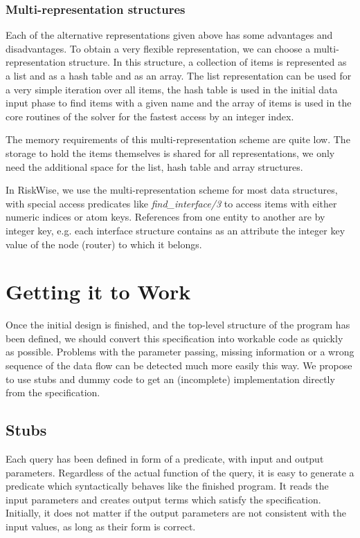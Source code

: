 \documentclass[a4paper,12pt]{report}
\begin{document}
\subsection{Multi-representation structures}
Each of the alternative representations given above has some advantages and disadvantages. To obtain a very flexible representation, we can choose a multi-representation structure. In this structure, a collection of items is represented as a list and as a hash table and as an array. The list representation can be used for a very simple iteration over all items, the hash table is used in the initial data input phase to find items with a given name and the array of items is used in the core routines of the solver for the fastest access by an integer index. 

The memory requirements of this multi-representation scheme are quite low. The storage to hold the items themselves is shared for all representations, we only need the additional space for the list, hash table and array structures.

In RiskWise, we use the multi-representation scheme for most data structures, with special access predicates like {\it find\_interface/3} to access items with either numeric indices or atom keys. References from one entity to another are by integer key, e.g. each interface structure contains as an attribute the integer key value of the node (router) to which it belongs.

\chapter{Getting it to Work}
\label{gettingittowork}

Once the initial design is finished, and the top-level structure of the program has been defined, we should convert this specification into workable code as quickly as possible. Problems with the parameter passing, missing information or a wrong sequence of the data flow can be detected much more easily this way. We propose to use stubs and dummy code to get an (incomplete) implementation directly from the specification.

\section{Stubs}
Each query has been defined in form of a predicate, with input and output parameters. Regardless of the actual function of the query, it is easy to generate a predicate which syntactically behaves like the finished program. It reads the input parameters and creates output terms which satisfy the specification. Initially, it does not matter if the output parameters are not consistent with the input values, as long as their form is correct.
\end{document}
